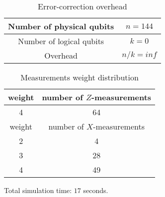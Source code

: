 \documentclass[12pt]{article}
\begin{document}
\newpage
\begin{table}[h]
\centering
\begin{tabular}{c c}
\hline
Number of physical qubits & $n = 144$ \\
\hline
Number of logical qubits & $k = 0$\\
\hline
Overhead & $n/k = inf$\\
\hline
\end{tabular}
\caption{Error-correction overhead}
\end{table}
\vspace{.3cm}


\begin{table}[h]
\centering
\begin{tabular}{c c}
\hline
weight & number of $Z$-measurements\\
\hline
4 & 64\\
\hline
\hline
weight & number of $X$-measurements\\
\hline
2 & 4\\
3 & 28\\
4 & 49\\
\hline
\end{tabular}
\caption{Measurements weight distribution}
\end{table}
\vspace{.3cm}



\vspace{2cm}
Total simulation time: $17$ seconds.
\end{document}

